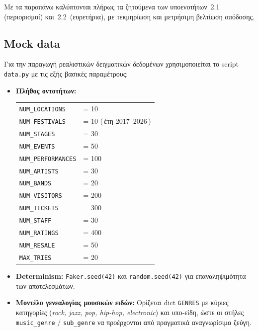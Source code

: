 \documentclass[a4paper,12pt]{article}
\begin{document}
\medskip
Με τα παραπάνω καλύπτονται πλήρως τα ζητούμενα των υποενοτήτων 2.1
(περιορισμοί) και 2.2 (ευρετήρια), με τεκμηρίωση και μετρήσιμη
βελτίωση απόδοσης.



\subsection{Mock data}

Για την παραγωγή ρεαλιστικών δειγματικών δεδομένων χρησιμοποιείται
το script \texttt{data.py} με τις εξής βασικές παραμέτρους:

\begin{itemize}
  \item \textbf{Πλήθος οντοτήτων:}
        \begin{tabular}{@{}ll@{}}
          \texttt{NUM\_LOCATIONS}       &= 10 \\
          \texttt{NUM\_FESTIVALS}       &= 10 \;(\,έτη 2017–2026\,)\\
          \texttt{NUM\_STAGES}          &= 30 \\
          \texttt{NUM\_EVENTS}          &= 50 \\
          \texttt{NUM\_PERFORMANCES}    &= 100 \\
          \texttt{NUM\_ARTISTS}         &= 30 \\
          \texttt{NUM\_BANDS}           &= 20 \\
          \texttt{NUM\_VISITORS}        &= 200 \\
          \texttt{NUM\_TICKETS}         &= 300 \\
          \texttt{NUM\_STAFF}           &= 30 \\
          \texttt{NUM\_RATINGS}         &= 400 \\
          \texttt{NUM\_RESALE}          &= 50 \\
          \texttt{MAX\_TRIES}           &= 20  %
        \end{tabular}

  \item \textbf{Determinism:}  
        \texttt{Faker.seed(42)} και \texttt{random.seed(42)} για
        επαναληψιμότητα των αποτελεσμάτων.

  \item \textbf{Μοντέλο γενεαλογίας μουσικών ειδών:}
        Ορίζεται dict \texttt{GENRES} με κύριες κατηγορίες
        (\emph{rock, jazz, pop, hip-hop, electronic}) και υπο‐είδη,
        ώστε οι στήλες \texttt{music\_genre} / \texttt{sub\_genre} να
        προέρχονται από πραγματικά αναγνωρίσιμα ζεύγη.


\end{itemize}
\end{document}
